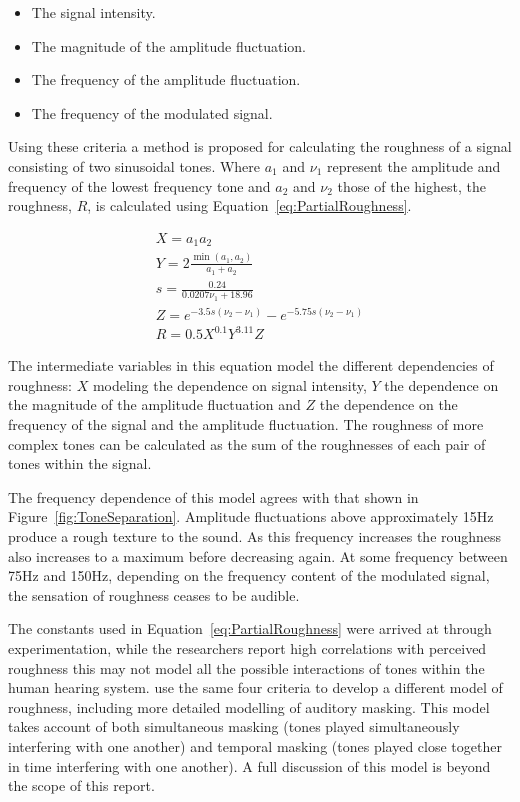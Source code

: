 		\begin{itemize}
			\item The signal intensity.
			\item The magnitude of the amplitude fluctuation.
			\item The frequency of the amplitude fluctuation.
			\item The frequency of the modulated signal.
		\end{itemize}

		Using these criteria a method is proposed for calculating the roughness of a signal consisting of two
		sinusoidal tones. Where $a_{1}$ and $\nu_{1}$ represent the amplitude and frequency of the lowest frequency
		tone and $a_{2}$ and $\nu_{2}$ those of the highest, the roughness, $R$, is calculated using
		Equation~\ref{eq:PartialRoughness}.
		
		\begin{gather}
			X = a_{1}a_{2} \nonumber \\
			Y = 2\frac{\min(a_{1}, a_{2})}{a_{1} + a_{2}} \nonumber \\
			s = \frac{0.24}{0.0207\nu_{1} + 18.96} \nonumber \\
			Z = e^{-3.5s(\nu_{2} - \nu_{1})} - e^{-5.75s(\nu_{2} - \nu_{1})} \nonumber \\
			R = 0.5X^{0.1}Y^{3.11}Z
			\label{eq:PartialRoughness}
		\end{gather}

		The intermediate variables in this equation model the different dependencies of roughness: $X$ modeling the
		dependence on signal intensity, $Y$ the dependence on the magnitude of the amplitude fluctuation and $Z$
		the dependence on the frequency of the signal and the amplitude fluctuation. The roughness of more complex
		tones can be calculated as the sum of the roughnesses of each pair of tones within the signal. 
		
		The frequency dependence of this model agrees with that shown in Figure~\ref{fig:ToneSeparation}. Amplitude
		fluctuations above approximately 15Hz produce a rough texture to the sound. As this frequency increases the
		roughness also increases to a maximum before decreasing again. At some frequency between 75Hz and 150Hz,
		depending on the frequency content of the modulated signal, the sensation of roughness ceases to be
		audible.

		The constants used in Equation~\ref{eq:PartialRoughness} were arrived at through experimentation, while the
		researchers report high correlations with perceived roughness this may not model all the possible
		interactions of tones within the human hearing system. \citet{fastl2007psychoacoustics} use the same four
		criteria to develop a different model of roughness, including more detailed modelling of auditory masking.
		This model takes account of both simultaneous masking (tones played simultaneously interfering with one
		another) and temporal masking (tones played close together in time interfering with one another). A full
		discussion of this model is beyond the scope of this report.

